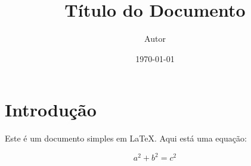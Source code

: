 \documentclass{article} %
\title{Título do Documento} %
\author{Autor} %
\date{\today} %
\begin{document}
\maketitle %

\section{Introdução} %
Este é um documento simples em LaTeX. Aqui está uma equação:

\[
a^2 + b^2 = c^2
\]
\end{document}
